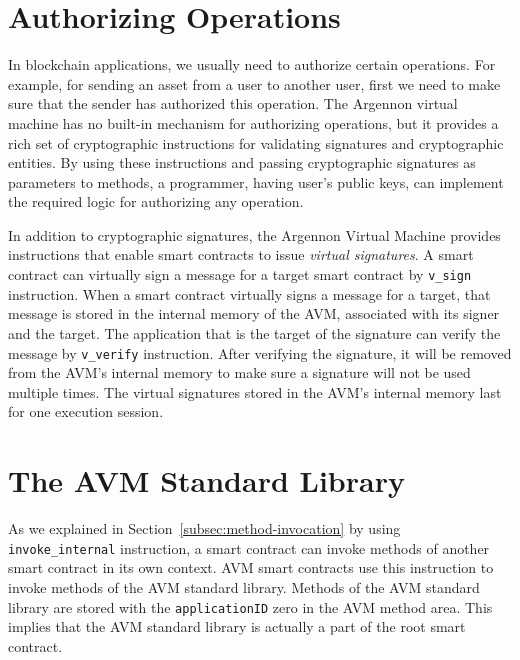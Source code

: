 \section{Authorizing Operations}\label{sec:authorizing-operations}

In blockchain applications, we usually need to authorize certain operations. For example, for sending an asset
from a user to another user, first we need to make sure that the sender has authorized this operation. The
Argennon virtual machine has no built-in mechanism for authorizing operations, but it provides a rich set of
cryptographic instructions for validating signatures and cryptographic entities. By using these instructions and
passing cryptographic signatures as parameters to methods, a programmer, having user's public keys, can implement
the required logic for authorizing any operation.


In addition to cryptographic signatures, the Argennon Virtual Machine provides instructions that enable
smart contracts to issue \emph{virtual signatures}. A smart contract can virtually sign a message for a target
smart contract by \texttt{v\_sign} instruction. When a smart contract
virtually signs a message for a target, that message is stored in the internal memory of the AVM, associated with
its signer and the target. The application that is the target of the signature can verify the message
by \texttt{v\_verify} instruction. After verifying the signature, it will be removed from the AVM's internal memory
to make sure a signature will not be used multiple times. The virtual signatures stored in the AVM's internal memory
last for one execution session.



\section{The AVM Standard Library}\label{sec:the-avm-standard-library}

As we explained in Section~\ref{subsec:method-invocation} by using \texttt{invoke\_internal} instruction, a smart
contract can invoke methods of another smart contract in its own context. AVM smart contracts use this instruction to
invoke methods of the AVM standard library. Methods of the AVM standard library are stored
with the \texttt{applicationID} zero in the AVM method area. This implies that the AVM standard library is actually
a part of the root smart contract.

